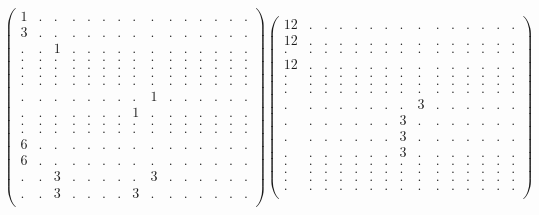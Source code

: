 \documentclass[12pt,a4paper]{amsart}
\begin{document}
\begin{align*}
\left(\begin{array}{rrrrrrrrrrrrrrr}%
1&.&.&.&.&.&.&.&.&.&.&.&.&.&.\\%
3&.&.&.&.&.&.&.&.&.&.&.&.&.&.\\%
.&.&1&.&.&.&.&.&.&.&.&.&.&.&.\\%
.&.&.&.&.&.&.&.&.&.&.&.&.&.&.\\%
.&.&.&.&.&.&.&.&.&.&.&.&.&.&.\\%
.&.&.&.&.&.&.&.&.&.&.&.&.&.&.\\%
.&.&.&.&.&.&.&.&.&.&.&.&.&.&.\\%
.&.&.&.&.&.&.&.&1&.&.&.&.&.&.\\%
.&.&.&.&.&.&.&1&.&.&.&.&.&.&.\\%
.&.&.&.&.&.&.&.&.&.&.&.&.&.&.\\%
.&.&.&.&.&.&.&.&.&.&.&.&.&.&.\\%
6&.&.&.&.&.&.&.&.&.&.&.&.&.&.\\%
6&.&.&.&.&.&.&.&.&.&.&.&.&.&.\\%
.&.&3&.&.&.&.&.&3&.&.&.&.&.&.\\%
.&.&3&.&.&.&.&3&.&.&.&.&.&.&.\\%
\end{array}\right)%
\left(\begin{array}{rrrrrrrrrrrrrrr}%
12&.&.&.&.&.&.&.&.&.&.&.&.&.&.\\%
12&.&.&.&.&.&.&.&.&.&.&.&.&.&.\\%
.&.&.&.&.&.&.&.&.&.&.&.&.&.&.\\%
12&.&.&.&.&.&.&.&.&.&.&.&.&.&.\\%
.&.&.&.&.&.&.&.&.&.&.&.&.&.&.\\%
.&.&.&.&.&.&.&.&.&.&.&.&.&.&.\\%
.&.&.&.&.&.&.&.&.&.&.&.&.&.&.\\%
.&.&.&.&.&.&.&.&3&.&.&.&.&.&.\\%
.&.&.&.&.&.&.&3&.&.&.&.&.&.&.\\%
.&.&.&.&.&.&.&3&.&.&.&.&.&.&.\\%
.&.&.&.&.&.&.&3&.&.&.&.&.&.&.\\%
.&.&.&.&.&.&.&.&.&.&.&.&.&.&.\\%
.&.&.&.&.&.&.&.&.&.&.&.&.&.&.\\%
.&.&.&.&.&.&.&.&.&.&.&.&.&.&.\\%
.&.&.&.&.&.&.&.&.&.&.&.&.&.&.\\%
\end{array}\right)%
\end{align*}
\end{document}
